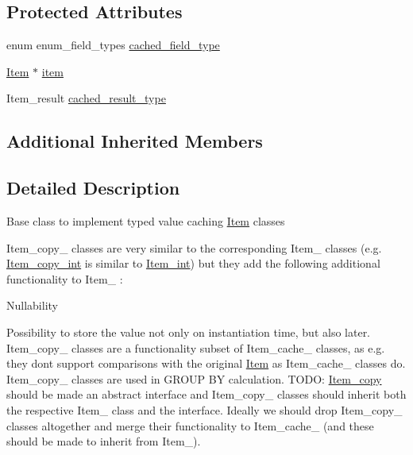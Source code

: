 \subsection*{Protected Attributes}
\begin{DoxyCompactItemize}
\item 
enum enum\+\_\+field\+\_\+types \mbox{\hyperlink{classItem__copy_a2b2bd611a7e3e0336047fd591e59e740}{cached\+\_\+field\+\_\+type}}
\item 
\mbox{\hyperlink{classItem}{Item}} $\ast$ \mbox{\hyperlink{classItem__copy_a9ef1b9fd547a3b940e89e9837083c87f}{item}}
\item 
Item\+\_\+result \mbox{\hyperlink{classItem__copy_a4d6be8ad88366f64c79477f0f145b72d}{cached\+\_\+result\+\_\+type}}
\end{DoxyCompactItemize}
\subsection*{Additional Inherited Members}


\subsection{Detailed Description}
Base class to implement typed value caching \mbox{\hyperlink{classItem}{Item}} classes

Item\+\_\+copy\+\_\+ classes are very similar to the corresponding Item\+\_\+ classes (e.\+g. \mbox{\hyperlink{classItem__copy__int}{Item\+\_\+copy\+\_\+int}} is similar to \mbox{\hyperlink{classItem__int}{Item\+\_\+int}}) but they add the following additional functionality to Item\+\_\+ \+:
\begin{DoxyEnumerate}
\item Nullability
\item Possibility to store the value not only on instantiation time, but also later. Item\+\_\+copy\+\_\+ classes are a functionality subset of Item\+\_\+cache\+\_\+ classes, as e.\+g. they don\textquotesingle{}t support comparisons with the original \mbox{\hyperlink{classItem}{Item}} as Item\+\_\+cache\+\_\+ classes do. Item\+\_\+copy\+\_\+ classes are used in G\+R\+O\+UP BY calculation. T\+O\+DO\+: \mbox{\hyperlink{classItem__copy}{Item\+\_\+copy}} should be made an abstract interface and Item\+\_\+copy\+\_\+ classes should inherit both the respective Item\+\_\+ class and the interface. Ideally we should drop Item\+\_\+copy\+\_\+ classes altogether and merge their functionality to Item\+\_\+cache\+\_\+ (and these should be made to inherit from Item\+\_\+). 
\end{DoxyEnumerate}

